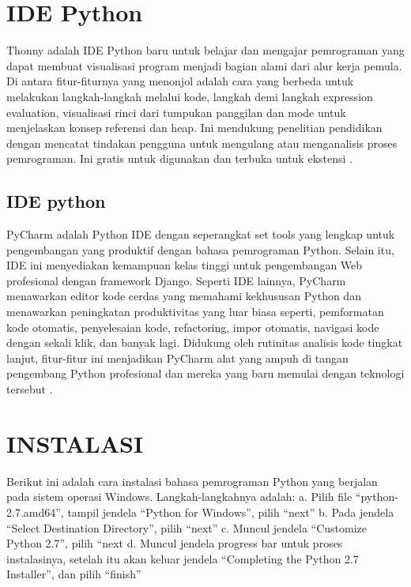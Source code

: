 \section{IDE Python}
Thonny adalah IDE Python baru untuk belajar dan mengajar pemrograman yang dapat membuat visualisasi program menjadi bagian alami dari alur kerja pemula.
Di antara fitur-fiturnya yang menonjol adalah cara yang berbeda untuk melakukan langkah-langkah melalui kode, langkah demi langkah expression evaluation, visualisasi rinci dari tumpukan panggilan dan mode untuk menjelaskan konsep referensi dan heap. Ini mendukung penelitian pendidikan dengan mencatat tindakan pengguna untuk mengulang atau menganalisis proses pemrograman. Ini gratis untuk digunakan dan terbuka untuk ekstensi \cite{annamaa2015introducing}.

\subsection{IDE python}
PyCharm adalah Python IDE dengan seperangkat set tools yang lengkap untuk pengembangan yang produktif dengan bahasa pemrograman Python. Selain itu, IDE ini menyediakan kemampuan kelas tinggi untuk pengembangan Web profesional dengan framework Django. Seperti IDE lainnya, PyCharm menawarkan editor kode cerdas yang memahami kekhususan Python dan menawarkan peningkatan produktivitas yang luar biasa seperti, pemformatan kode otomatis, penyelesaian kode, refactoring, impor otomatis, navigasi kode dengan sekali klik, dan banyak lagi. Didukung oleh rutinitas analisis kode tingkat lanjut, fitur-fitur ini menjadikan PyCharm alat yang ampuh di tangan pengembang Python profesional dan mereka yang baru memulai dengan teknologi tersebut \cite{fifli2016pirhoogammarhoalphamumualpha}.

\section{INSTALASI}
Berikut ini adalah cara instalasi bahasa pemrograman Python yang berjalan pada sistem operasi Windows. Langkah-langkahnya adalah: 
a. Pilih file “python-2.7.amd64”, tampil jendela “Python for Windows”, pilih “next” 
b. Pada jendela “Select Destination Directory”, pilih “next”
 c. Muncul jendela “Customize Python 2.7”, pilih “next
 d. Muncul jendela progress bar untuk proses instalasinya, setelah itu akan keluar jendela “Completing the Python 2.7 Installer”, dan pilih “finish” \citep{wicaksana2013user} 

